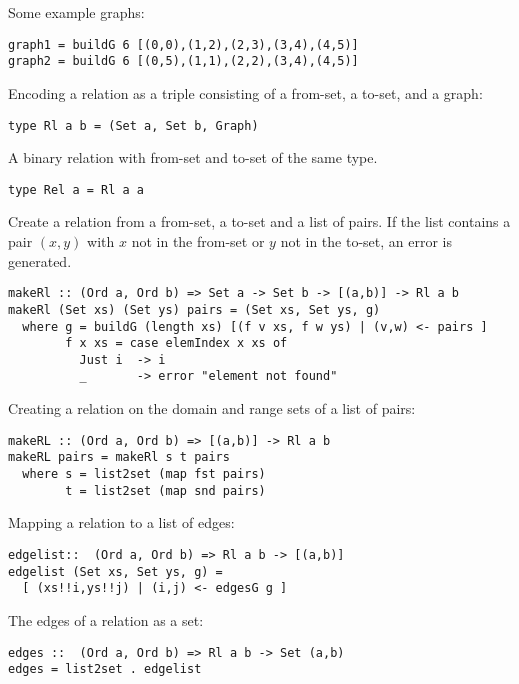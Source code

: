Some example graphs: 

\bc\begin{verbatim}
graph1 = buildG 6 [(0,0),(1,2),(2,3),(3,4),(4,5)]
graph2 = buildG 6 [(0,5),(1,1),(2,2),(3,4),(4,5)]
\end{verbatim}\ec

Encoding a relation as a triple consisting of a from-set, 
a to-set, and a graph: 

\bc\begin{verbatim} 
type Rl a b = (Set a, Set b, Graph)
\end{verbatim}\ec

A binary relation with from-set and to-set of the same type. 

\bc\begin{verbatim} 
type Rel a = Rl a a 
\end{verbatim}\ec

Create a relation from a from-set, a to-set and 
a list of pairs. If the list contains a pair $(x,y)$ with 
$x$ not in the from-set or $y$ not in the to-set, an 
error is generated. 

\bc\begin{verbatim}
makeRl :: (Ord a, Ord b) => Set a -> Set b -> [(a,b)] -> Rl a b
makeRl (Set xs) (Set ys) pairs = (Set xs, Set ys, g) 
  where g = buildG (length xs) [(f v xs, f w ys) | (v,w) <- pairs ]
        f x xs = case elemIndex x xs of 
          Just i  -> i 
          _       -> error "element not found"
\end{verbatim}\ec

Creating a relation on the domain and range sets of 
a list of pairs: 

\bc\begin{verbatim}
makeRL :: (Ord a, Ord b) => [(a,b)] -> Rl a b 
makeRL pairs = makeRl s t pairs  
  where s = list2set (map fst pairs) 
        t = list2set (map snd pairs)
\end{verbatim}\ec

Mapping a relation to a list of edges: 

\bc\begin{verbatim} 
edgelist::  (Ord a, Ord b) => Rl a b -> [(a,b)]
edgelist (Set xs, Set ys, g) = 
  [ (xs!!i,ys!!j) | (i,j) <- edgesG g ]
\end{verbatim}\ec

The edges of a relation as a set: 

\bc\begin{verbatim} 
edges ::  (Ord a, Ord b) => Rl a b -> Set (a,b)
edges = list2set . edgelist 
\end{verbatim}\ec

